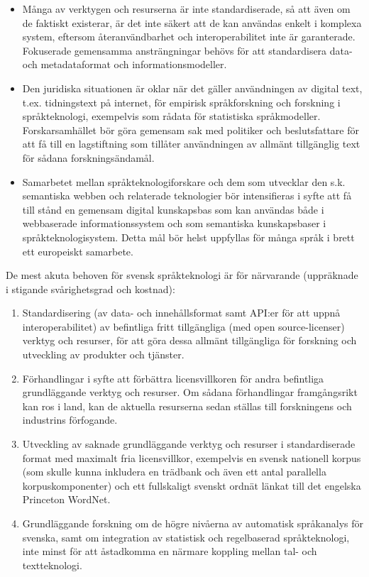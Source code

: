 \begin{multicols}{2}
\begin{itemize}[itemsep=0pt,parsep=0pt]
\item Många av verktygen och resurserna är inte standardiserade, så
  att även om de faktiskt exi\-ste\-rar, är det inte säkert att de kan
  användas enkelt i komplexa system, eftersom åter\-an\-vänd\-bar\-het
  och inter\-operabilitet inte är garanterade. Fokuserade gemensamma
  ansträngningar behövs för att standardisera \mbox{data-} och
  metadataformat och informationsmodeller.
\item Den juridiska situationen är oklar när det gäller användningen
  av digital text, t.ex. tidningstext på internet, för empirisk
  språkforskning och forskning i språkteknologi, exempelvis som rådata
  för statistiska språkmodeller. Forskarsamhället bör göra gemensam
  sak med politiker och beslutsfattare för att få till en lagstiftning
  som tillåter användningen av allmänt tillgänglig text för sådana
  forskningsändamål.
\item Samarbetet mellan språkteknologiforskare och dem som utvecklar
  den s.k. semantiska webben och relaterade teknologier bör
  intensifieras i syfte att få till stånd en gemensam digital
  kunskapsbas som kan användas både i webbaserade informationssystem
  och som semantiska kunskapsbaser i språk\-tekno\-logi\-sys\-tem. Detta mål
  bör helst uppfyllas för många språk i brett ett europeiskt
  samarbete.

\end{itemize}

De mest akuta behoven för svensk språkteknologi är för närvarande
(uppräknade i stigande svårighetsgrad och kostnad):

\begin{enumerate}[itemsep=0pt,parsep=0pt]
\item Standardisering (av data- och innehållsformat samt API:er för
  att uppnå interoperabilitet) av befintliga fritt tillgängliga (med
  open source-licenser) verktyg och resurser, för att göra dessa
  allmänt tillgängliga för forskning och utveckling av produkter och
  tjänster.
\item Förhandlingar i syfte att förbättra licensvillkoren för andra
  befintliga grundläggande verktyg och resurser. Om sådana
  förhandlingar framgångsrikt kan ros i land, kan de aktuella
  resurserna sedan ställas till forskningens och industrins
  förfogande.
\item Utveckling av saknade grundläggande verktyg och resurser i
  standardiserade format med maximalt fria licensvillkor, exempelvis
  en svensk nationell korpus (som skulle kunna inkludera en trädbank
  och även ett antal parallella korpuskomponenter) och ett fullskaligt
  svenskt ordnät länkat till det engelska Princeton WordNet.
\item Grundläggande forskning om de högre nivåerna av automatisk
  språkanalys för svenska, samt om integration av statistisk och
  regelbaserad språkteknologi, inte minst för att åstadkomma en
  närmare koppling mellan \mbox{tal-} och textteknologi.
\end{enumerate}


\end{multicols}
